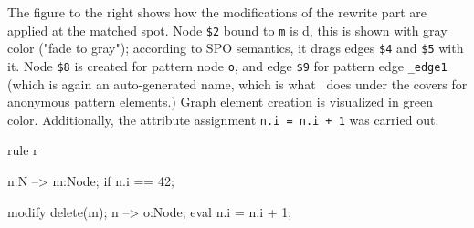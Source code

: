 \begin{example}
The figure to the right shows how the modifications of the rewrite part are applied at the matched spot. 
Node \verb#$2# bound to \texttt{m} is d, this is shown with gray color ("fade to gray"); according to SPO semantics, it drags edges \verb#$4# and \verb#$5# with it.
Node \verb#$8# is created for pattern node \texttt{o}, and edge \verb#$9# for pattern edge \texttt{\_edge1} (which is again an auto-generated name, which is what \GrG\ does under the covers for anonymous pattern elements.)
Graph element creation is visualized in green color.
Additionally, the attribute assignment \verb#n.i = n.i + 1# was carried out.

\begin{grgen}
rule r
{
  n:N --> m:Node;
  if{ n.i == 42; }
	
  modify {
    delete(m);
    n --> o:Node;
    eval { n.i = n.i + 1; }
  }
}
\end{grgen}\label{examplebasicpatternmatching}

\end{example}

